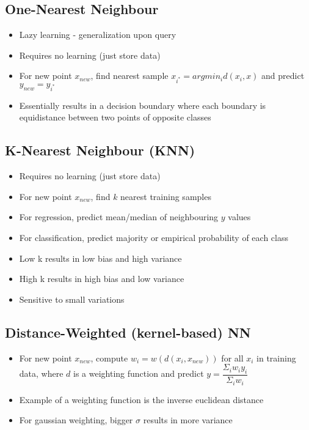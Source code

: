 \documentclass[12pt]{article}
\begin{document}
\subsection{One-Nearest Neighbour}

\begin{itemize}
	\item Lazy learning - generalization upon query
	\item Requires no learning (just store data)
	\item For new point $x_{new}$, find nearest sample $x_{i^*} = argmin_i d(x_i, x)$ and predict $y_{new} = y_{i^*}$
	\item Essentially results in a decision boundary where each boundary is equidistance between two points of opposite classes
\end{itemize}

\subsection{K-Nearest Neighbour (KNN)}

\begin{itemize}
	\item Requires no learning (just store data)
	\item For new point $x_{new}$, find $k$ nearest training samples 
	\item For regression, predict mean/median of neighbouring $y$ values 
	\item For classification, predict majority or empirical probability of each class
	\item Low k results in low bias and high variance 
	\item High k results in high bias and low variance 
	\item Sensitive to small variations
\end{itemize}

\subsection{Distance-Weighted (kernel-based) NN}

\begin{itemize}
	\item For new point $x_{new}$, compute $w_i = w(d(x_i, x_{new}))$ for all $x_i$ in training data, where $d$ is a weighting function and predict $y = \dfrac{\Sigma_i w_i y_i}{\Sigma_i w_i}$
	\item Example of a weighting function is the inverse euclidean distance
	\item For gaussian weighting, bigger $\sigma$ results in more variance
\end{itemize}
\end{document}
